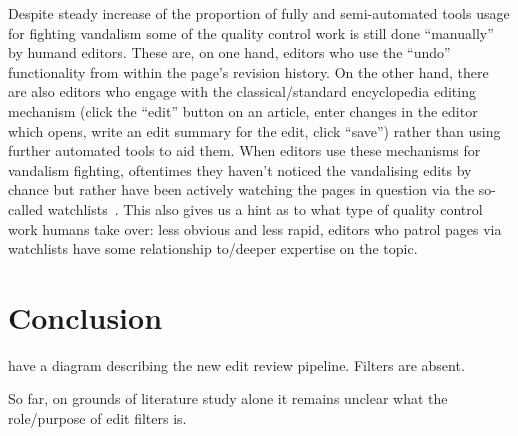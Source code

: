 Despite steady increase of the proportion of fully and semi-automated tools usage for fighting vandalism %
some of the quality control work is still done ``manually'' by humand editors.
These are, on one hand, editors who use the ``undo'' functionality from within the page's revision history.
On the other hand, there are also editors who engage with the classical/standard encyclopedia editing mechanism (click the ``edit'' button on an article, enter changes in the editor which opens, write an edit summary for the edit, click ``save'') rather than using further automated tools to aid them.
When editors use these mechanisms for vandalism fighting, oftentimes they haven't noticed the vandalising edits by chance but rather have been actively watching the pages in question via the so-called watchlists~\cite{AstHal2018}.
This also gives us a hint as to what type of quality control work humans take over: less obvious and less rapid, editors who patrol pages via watchlists have some relationship to/deeper expertise on the topic. %

\section{Conclusion}
\cite{AstHal2018} have a diagram describing the new edit review pipeline. Filters are absent.

\begin{comment}
\section{Algorithmic Governance}

should be mentioned here;
it's important for framing along with Lessig's "Code is law".

algorithmic governance?/socio-technical assemblage
* humans
* software
* tech. infrastructure

\cite{GeiHal2017}

Claudia's paper:
"“In both cases of algorithmic governance
– software features and bots – making rules part of the infrastructure, to a certain extent, makes
them harder to change and easier to enforce” (p. 87)"

\section{Vandalism on Wikipedia}

Papers discussing vandalism detection from IR/ML perspective:
- Martin Potthast, Benno Stein, and Robert Gerling. 2008. Automatic vandalism detection in Wikipedia. In European conference on information retrieval. Springer, 663–668.

\end{comment}

So far, on grounds of literature study alone it remains unclear what the role/purpose of edit filters is.
